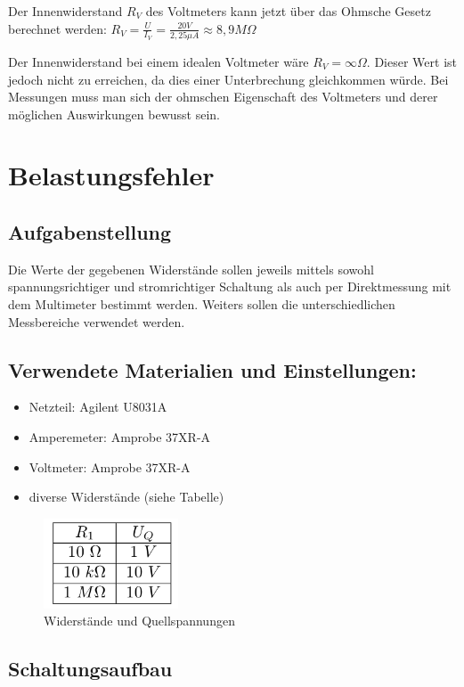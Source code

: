 \documentclass[12pt,a4paper,titlepage]{article}
\begin{document}
\noindent Der Innenwiderstand $R_V$ des Voltmeters kann jetzt über das Ohmsche Gesetz berechnet werden: $R_V = \frac{U}{I_V} = \frac{20V}{2,25\mu A} \approx 8,9M\Omega$

\noindent Der Innenwiderstand bei einem idealen Voltmeter wäre $R_V = \infty\Omega$. Dieser Wert ist jedoch nicht zu erreichen, da dies einer Unterbrechung gleichkommen würde. Bei Messungen muss man sich der ohmschen Eigenschaft des Voltmeters und derer möglichen Auswirkungen bewusst sein.

\section{Belastungsfehler}

\subsection{Aufgabenstellung}
Die Werte der gegebenen Widerstände sollen jeweils mittels sowohl spannungsrichtiger und stromrichtiger Schaltung als auch per Direktmessung mit dem Multimeter bestimmt werden. Weiters sollen die unterschiedlichen Messbereiche verwendet werden.

\subsection{Verwendete Materialien und Einstellungen:}
\begin{itemize}
  \item Netzteil: Agilent U8031A
  \item Amperemeter: Amprobe 37XR-A
  \item Voltmeter: Amprobe 37XR-A
  \item diverse Widerstände (siehe Tabelle)
\end{itemize}

\begin{figure}[H]
  \centering
  \label{Figure2.2.1}
  \includegraphics[width=40mm]{widerstandtabelle.png}
  \caption{Widerstände und Quellspannungen}
\end{figure}

\subsection{Schaltungsaufbau}
\end{document}
